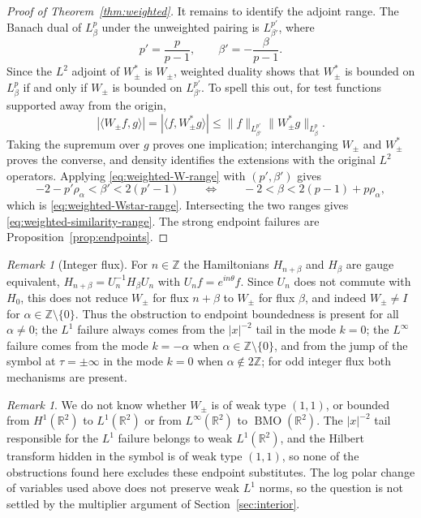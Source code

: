 \documentclass[11pt,a4paper,reqno,backref=page]{amsart}
\newcommand{\R}{\mathbb R}
\newcommand{\Z}{\mathbb Z}
\numberwithin{equation}{section}
\theoremstyle{definition}
\theoremstyle{remark}
\newtheorem{remark}[theorem]{Remark}
\begin{document}
\begin{proof}[Proof of Theorem~\ref{thm:weighted}]
It remains to identify the adjoint range. The Banach dual of
$L^p_\beta$ under the unweighted pairing is $L^{p'}_{\beta'}$,
where
\begin{equation*}
  p'=\frac{p}{p-1},
  \qquad
  \beta'=-\frac{\beta}{p-1}.
\end{equation*}
Since the $L^2$ adjoint of $W_\pm^*$ is $W_\pm$, weighted
duality shows that $W_\pm^*$ is bounded on $L^p_\beta$ if and
only if $W_\pm$ is bounded on $L^{p'}_{\beta'}$. To spell this
out, for test functions supported away from the origin,
\begin{equation*}
  |\langle W_\pm f,g\rangle|
  =|\langle f,W_\pm^*g\rangle|
  \le \|f\|_{L^{p'}_{\beta'}}\|W_\pm^*g\|_{L^p_\beta}.
\end{equation*}
Taking the supremum over $g$ proves one implication;
interchanging $W_\pm$ and $W_\pm^*$ proves the converse, and
density identifies the extensions with the original $L^2$
operators. Applying \eqref{eq:weighted-W-range} with
$(p',\beta')$ gives
\begin{equation*}
  -2-p'\rho_\alpha<\beta'<2(p'-1)
  \qquad\Longleftrightarrow\qquad
  -2<\beta<2(p-1)+p\rho_\alpha,
\end{equation*}
which is \eqref{eq:weighted-Wstar-range}. Intersecting the two
ranges gives \eqref{eq:weighted-similarity-range}.
The strong endpoint failures are
Proposition~\ref{prop:endpoints}.
\end{proof}


\begin{remark}[Integer flux]\label{rem:gauge}
For $n\in\Z$ the Hamiltonians $H_{n+\beta}$ and $H_\beta$ are
gauge equivalent, $H_{n+\beta}=U_n^{-1}H_\beta U_n$ with
$U_nf=e^{in\theta}f$. Since $U_n$ does not commute with $H_0$,
this does not reduce $W_\pm$ for flux $n+\beta$ to $W_\pm$ for
flux $\beta$, and indeed $W_\pm\ne I$ for
$\alpha\in\Z\setminus\{0\}$. 
Thus the obstruction to endpoint boundedness is present for
all $\alpha\neq0$; the $L^1$ failure always comes from
the $|x|^{-2}$ tail in the mode $k=0$; the $L^\infty$ failure
comes from the mode $k=-\alpha$ when
$\alpha\in\Z\setminus\{0\}$, and from the jump of the symbol at
$\tau=\pm\infty$ in the mode $k=0$ when $\alpha\notin2\Z$; for
odd integer flux both mechanisms are present.
\end{remark}

\begin{remark}
We do not know whether $W_\pm$ is of weak type $(1,1)$, or
bounded from $H^1(\R^2)$ to $L^1(\R^2)$ or from $L^\infty(\R^2)$
to $\operatorname{BMO}(\R^2)$. The $|x|^{-2}$ tail responsible
for the $L^1$ failure belongs to weak $L^1(\R^2)$, and the
Hilbert transform hidden in the symbol is of weak type $(1,1)$,
so none of the obstructions found here excludes these endpoint
substitutes. The log polar change of variables used above does
not preserve weak $L^1$ norms, so the question is not settled by
the multiplier argument of Section~\ref{sec:interior}.
\end{remark}
\end{document}
